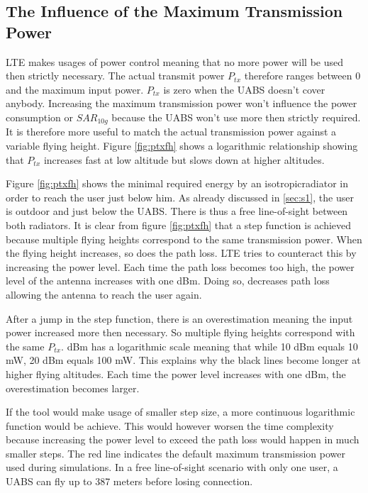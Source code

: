 \subsection{The Influence of the Maximum Transmission Power}
\gls{LTE} makes usages of power control meaning that no more power will be used then strictly necessary. The actual 
transmit power $P_{tx}$ therefore ranges between 0 and the maximum input power. $P_{tx}$ is zero when the \gls{UABS} doesn't cover anybody.
Increasing the maximum transmission power won't influence the power consumption or $SAR_{10g}$ because the \gls{UABS} won't use more
then strictly required. It is therefore more useful to match the actual transmission power against a variable flying height. Figure \ref{fig:ptxfh}
shows a logarithmic  relationship showing that $P_{tx}$ increases fast at low altitude but slows down at higher altitudes. 

Figure \ref{fig:ptxfh} shows the minimal required energy by an \gls{isotropicradiator} in order to reach the user just below him.
As already discussed in \ref{sec:s1}, the user is outdoor and just below the \gls{UABS}. There is thus a free line-of-sight between both
radiators. It is clear  from figure \ref{fig:ptxfh} that a step function is achieved because multiple flying heights correspond to the same transmission power.
When the flying height increases, so does the path loss. \gls{LTE} tries to counteract this by increasing the power level. Each time 
the path loss becomes too high, the power level of the antenna increases with one dBm. Doing so, decreases path loss allowing the antenna to reach
the user again. 

After a jump in the step function, there is an overestimation meaning the input power increased more then necessary. So multiple flying heights correspond with the same $P_{tx}$.
dBm has a logarithmic scale meaning that while 10 dBm equals 10 mW, 20 dBm equals 100 mW. This explains why the black lines become longer at higher flying altitudes.
Each time the power level increases with one dBm, the overestimation becomes larger.

If the tool would make usage of smaller step size, a more continuous 
logarithmic function would be achieve. This would however worsen the time complexity because increasing the power level to exceed the path loss
would happen in much smaller steps. The red line indicates the default maximum transmission power used during simulations. 
In a free line-of-sight scenario with only one user, a \gls{UABS} can fly up to 387 meters before losing connection.

